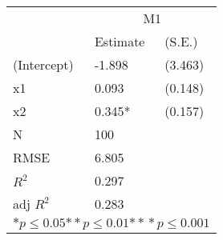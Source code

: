 \begin{tabular}{*{3}{l}}
\hline
                  & \multicolumn{2}{c}{M1}   \tabularnewline
                   &Estimate  &(S.E.)  \tabularnewline
 \hline
 \hline
   (Intercept)     &-1.898   &   (3.463) \tabularnewline
   x1              &0.093   &   (0.148) \tabularnewline
   x2              &0.345*   &   (0.157) \tabularnewline
 \hline
 N                 &100       &        \tabularnewline
 RMSE             &6.805         & \tabularnewline
 $R^2$             &0.297         & \tabularnewline
 adj $R^2$         &0.283         & \tabularnewline
 \hline
\hline
 
 \multicolumn{3}{c}{${*  p}\le 0.05$${*\!\!*  p}\le 0.01$${*\!\!*\!\!*  p}\le 0.001$}\tabularnewline
 \end{tabular}